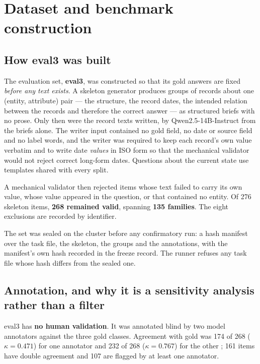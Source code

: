 \section{Dataset and benchmark construction}
\label{sec:dataset}

\subsection{How eval3 was built}

The evaluation set, \textbf{eval3}, was constructed so that its gold answers are fixed \emph{before any text
exists}. A skeleton generator produces groups of records about one (entity, attribute) pair --- the structure, the
record dates, the intended relation between the records and therefore the correct answer --- as structured briefs
with no prose. Only then were the record texts written, by Qwen2.5-14B-Instruct from the briefs alone. The writer
input contained no gold field, no date or source field and no label words, and the writer was required to keep each
record's own value verbatim and to write date \emph{values} in ISO form so that the mechanical validator would not
reject correct long-form dates. Questions about the current state use templates shared with every split.

A mechanical validator then rejected items whose text failed to carry its own value, whose value appeared in the
question, or that contained no entity. Of 276 skeleton items, \textbf{268 remained valid}, spanning
\textbf{135 families}. The eight exclusions are recorded by identifier.

The set was sealed on the cluster before any confirmatory run: a hash manifest over the task file, the skeleton,
the groups and the annotations, with the manifest's own hash recorded in the freeze record. The runner refuses any
task file whose hash differs from the sealed one.

\subsection{Annotation, and why it is a sensitivity analysis rather than a filter}

eval3 has \textbf{no human validation}. It was annotated blind by two model annotators against the three gold
classes. Agreement with gold was 174 of 268 ($\kappa=0.471$) for one annotator and 232 of 268 ($\kappa=0.767$) for
the other \citep{cohen1960kappa}; 161 items have double agreement and 107 are flagged by at least one annotator.

